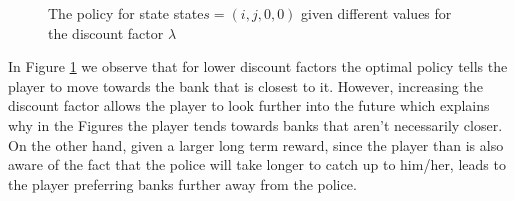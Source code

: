 \documentclass{article}
\begin{document}
\begin{figure}[h!]
    \centering
    \caption{The policy for state state$s=(i,j,0,0)$ given different values for the discount factor $\lambda$}
    \label{fig:q2-grid}
\end{figure}

In Figure \ref{fig:q2-grid} we observe that for lower discount factors the optimal policy tells the player to move towards the bank that is closest to it. However, increasing the discount factor allows the player to look further into the future which explains why in the Figures the player tends towards banks that aren't necessarily closer. On the other hand, given a larger long term reward, since the player than is also aware of the fact that the police will take longer to catch up to him/her, leads to the player preferring banks further away from the police.
\end{document}
